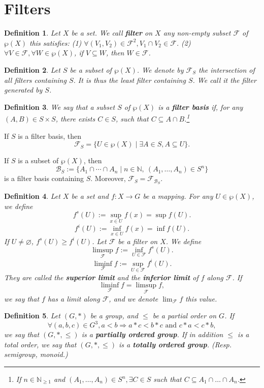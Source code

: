 \documentclass{article}
\theoremstyle{1}
\newtheorem{definition}{Definition}[section]
\newcommand{\NN}{\mathbb{N}} %
\begin{document}
\section{Filters}
\begin{definition}
    Let $X$ be a set. We call \textbf{filter} on $X$ any non-empty subset $\mathcal{F}$ of $\wp(X)$ this satisfies:
    \newline
    (1) $\forall(V_1,V_2)\in \mathcal{F}^2, V_1\cap V_2\in \mathcal{F}$.
    \newline
    (2) $ \forall V\in \mathcal{F}, \forall W\in \wp(X)$, if $V\subseteq W$, then $W\in \mathcal{F}$.
\end{definition}
\begin{definition}
    Let $S$ be a subset of $\wp(X)$. We denote by $\mathcal{F}_S$ the intersection of all filters containing $S$. It is thus the least filter containing $S$. We call it the filter generated by $S$.
\end{definition}
\begin{definition}
    We say that a subset $S$ of $\wp(X)$ is a \textbf{filter basis} if, for any $(A,B)\in S\times S$, there exists $C\in S$, such that $C\subseteq A\cap B$.\footnote{If $n\in \NN_{\ge 1}$ and $(A_1,\dots,A_n)\in S^n,\exists C\in S$ such that $C\subseteq A_1\cap \dots\cap A_n$.}
\end{definition}

    If $S$ is a filter basis, then 
    $$\mathcal{F}_S=\{U\in \wp(X)\mid \exists A\in S, A\subseteq U\}.$$
    
    If $S$ is a subset of $\wp(X)$, then 
    $$\mathcal{B}_S:=\{A_1\cap \cdots \cap A_n\mid n\in \NN,\ (A_1,\dots,A_n)\in S^n\}$$
    is a filter basis containing $S$. Moreover, $\mathcal{F}_S=\mathcal{F}_{\mathcal{B}_S}$.
\begin{definition}
    Let $X$ be a set and $f:X\longrightarrow G$ be a mapping. For any $U\in \wp(X)$, we define 
    $$f^s(U):=\sup_{x\in U}f(x)=\sup f(U).$$
    $$f^i(U):=\inf_{x\in U}f(x)=\inf f(U).$$
    If $U\not=\varnothing$, $f^s(U)\ge f^i(U)$. Let $\mathcal{F}$ be a filter on $X$. We define 
    $$\limsup_\mathcal{F} f:=\inf_{U\in \mathcal{F}} f^s(U).$$
    $$\liminf_\mathcal{F} f:=\sup_{U\in \mathcal{F}} f^i(U).$$
    They are called the \textbf{superior limit} and the \textbf{inferior limit} of $f$ along $\mathcal{F}$. If 
    $$\liminf_\mathcal{F} f=\limsup_\mathcal{F} f,$$
    we say that $f$ has a limit along $\mathcal{F}$, and we denote $\displaystyle \lim_{\mathcal{F}}f$ this value.
\end{definition}
\begin{definition}
    Let $(G,*)$ be a group, and $\le $ be a partial order on $G$. If 
    $$\forall (a,b,c)\in G^3,a<b\Rightarrow a*c<b*c \text{ and } c*a<c*b,$$
    we say that $(G,*,\le)$ is a \textbf{partially ordered group}. If in addition $\le $ is a total order, we say that $(G,*,\le)$ is a \textbf{totally ordered group}. (Resp. semigroup, monoid.)
\end{definition}
\end{document}
